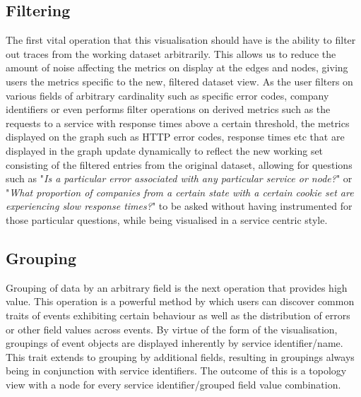 \documentclass[12pt,pdftex,titlepage]{report}
\begin{document}
            \subsection{Filtering}
                The first vital operation that this visualisation should have is the ability to filter out traces from the working dataset arbitrarily. This allows us to reduce the amount of noise affecting the metrics
                on display at the edges and nodes, giving users the metrics specific to the new, filtered dataset view. As the user filters on various fields of arbitrary cardinality such as specific error codes,
                company identifiers or even performs filter operations on derived metrics such as the requests to a service with response times above a certain threshold, the metrics displayed on the graph such as HTTP error codes, 
                response times etc that are displayed in the graph update dynamically to reflect the new working set consisting of the filtered entries from the original dataset, allowing for questions such as "\textit{Is a particular 
                error associated with any particular service or node?}" or "\textit{What proportion of companies from a certain state with a certain cookie set are experiencing slow response times?}" to be asked without having 
                instrumented for those particular questions, while being visualised in a service centric style.

            \subsection{Grouping}
                Grouping of data by an arbitrary field is the next operation that provides high value. This operation is a powerful method by which users can discover common traits of events exhibiting certain behaviour as well as the
                distribution of errors or other field values across events. By virtue of the form of the visualisation, groupings of event objects are displayed inherently by service identifier/name. This trait extends to grouping by
                additional fields, resulting in groupings always being in conjunction with service identifiers. The outcome of this is a topology view with a node for every service identifier/grouped field value combination. 
                
\end{document}
